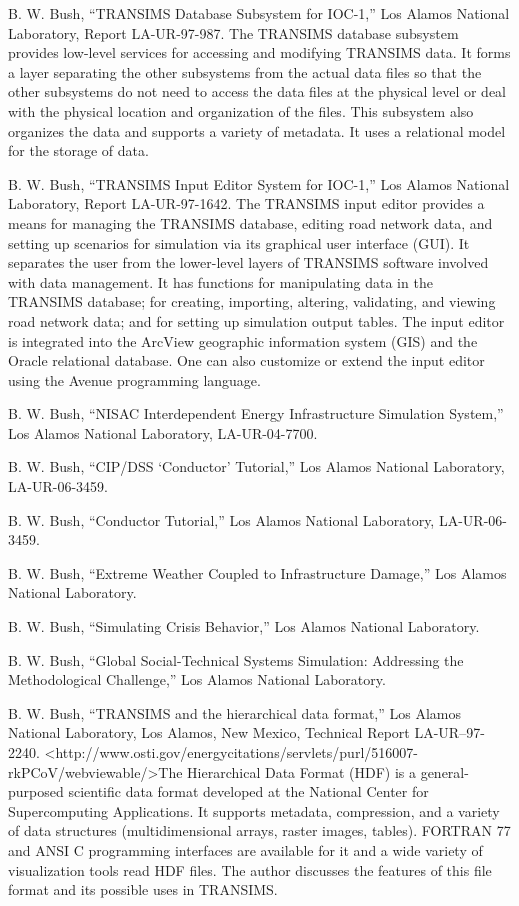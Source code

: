 \documentclass[]{article}
\begin{document}
B. W. Bush, ``TRANSIMS Database Subsystem for IOC-1,'' Los Alamos
National Laboratory, Report LA-UR-97-987. The TRANSIMS database
subsystem provides low-level services for accessing and modifying
TRANSIMS data. It forms a layer separating the other subsystems from the
actual data files so that the other subsystems do not need to access the
data files at the physical level or deal with the physical location and
organization of the files. This subsystem also organizes the data and
supports a variety of metadata. It uses a relational model for the
storage of data.

B. W. Bush, ``TRANSIMS Input Editor System for IOC-1,'' Los Alamos
National Laboratory, Report LA-UR-97-1642. The TRANSIMS input editor
provides a means for managing the TRANSIMS database, editing road
network data, and setting up scenarios for simulation via its graphical
user interface (GUI). It separates the user from the lower-level layers
of TRANSIMS software involved with data management. It has functions for
manipulating data in the TRANSIMS database; for creating, importing,
altering, validating, and viewing road network data; and for setting up
simulation output tables. The input editor is integrated into the
ArcView geographic information system (GIS) and the Oracle relational
database. One can also customize or extend the input editor using the
Avenue programming language.

B. W. Bush, ``NISAC Interdependent Energy Infrastructure Simulation
System,'' Los Alamos National Laboratory, LA-UR-04-7700.

B. W. Bush, ``CIP/DSS `Conductor' Tutorial,'' Los Alamos National
Laboratory, LA-UR-06-3459.

B. W. Bush, ``Conductor Tutorial,'' Los Alamos National Laboratory,
LA-UR-06-3459.

B. W. Bush, ``Extreme Weather Coupled to Infrastructure Damage,'' Los
Alamos National Laboratory.

B. W. Bush, ``Simulating Crisis Behavior,'' Los Alamos National
Laboratory.

B. W. Bush, ``Global Social-Technical Systems Simulation: Addressing the
Methodological Challenge,'' Los Alamos National Laboratory.

B. W. Bush, ``TRANSIMS and the hierarchical data format,'' Los Alamos
National Laboratory, Los Alamos, New Mexico, Technical Report
LA-UR--97-2240.
\textless{}http://www.osti.gov/energycitations/servlets/purl/516007-rkPCoV/webviewable/\textgreater{}The
Hierarchical Data Format (HDF) is a general-purposed scientific data
format developed at the National Center for Supercomputing Applications.
It supports metadata, compression, and a variety of data structures
(multidimensional arrays, raster images, tables). FORTRAN 77 and ANSI C
programming interfaces are available for it and a wide variety of
visualization tools read HDF files. The author discusses the features of
this file format and its possible uses in TRANSIMS.
\end{document}
